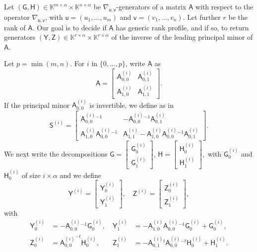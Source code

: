 \documentclass{sig-alternate}
\newcommand{\vu}{\ensuremath{\mathsf{u}}}
\newcommand{\vv}{\ensuremath{\mathsf{v}}}
\newcommand{\mA}{\ensuremath{\mathsf{A}}}
\newcommand{\mG}{\ensuremath{\mathsf{G}}}
\newcommand{\mH}{\ensuremath{\mathsf{H}}}
\newcommand{\mS}{\ensuremath{\mathsf{S}}}
\newcommand{\mY}{\ensuremath{\mathsf{Y}}}
\newcommand{\mZ}{\ensuremath{\mathsf{Z}}}
\newcommand{\K}{\ensuremath{\mathbb{K}}}
\begin{document}
Let 
$(\mG,\mH) \in \K^{m\times \alpha} \times \K^{n\times \alpha}$ be
$\nabla_{\vu,\vv}$-generators of a matrix $\mA$ with respect to the operator
$\nabla_{\vu,\vv}$, with $\vu=(u_1,\dots,u_m)$ and $\vv=(v_1,\dots,v_n)$. Let
further $r$ be the rank of $\mA$. Our goal is to decide if $\mA$ has
generic rank profile, and if so, to return generators $(\mY,\mZ) \in
\K^{r\times \alpha} \times \K^{r\times \alpha}$ of the inverse of the
leading principal minor of $\mA$.


Let $p=\min(m,n)$. For $i$ in $\{0,\dots,p\}$, write $\mA$ as
$$\mA=\left [\begin{matrix} {\mA^{(i)}_{0,0}} & \mA^{(i)}_{0,1} \\[1mm] \mA^{(i)}_{1,0} & \mA^{(i)}_{1,1}
\end{matrix}\right ].$$ 
If the principal minor
 ${\mA^{(i)}_{0,0}}$  is invertible, we define as in~\cite{Cardinal99}
$$\mS^{(i)} = \left [\begin{matrix} {\mA^{(i)}_{0,0}}{}^{-1} & -{\mA^{(i)}_{0,0}}{}^{-1} \mA^{(i)}_{0,1} \\[1mm] \mA^{(i)}_{1,0} {\mA^{(i)}_{0,0}}{}^{-1}& \mA^{(i)}_{1,1} - \mA^{(i)}_{1,0} {\mA^{(i)}_{0,0}}{}^{-1} \mA^{(i)}_{0,1} 
\end{matrix}\right ].$$
We next write the decompositions $\mG=\left [\begin{matrix}
    \mG^{(i)}_0 \\    \mG^{(i)}_1 
  \end{matrix}\right ]$, $\mH=\left [\begin{matrix} 
        \mH^{(i)}_0 \\    \mH^{(i)}_1 
  \end{matrix}\right ],$
with $\mG^{(i)}_0$ and $\mH^{(i)}_0$ of size $i \times \alpha$
and
we define
\begin{equation}
\mY^{(i)}
 = \left [\begin{matrix}
  \mY^{(i)}_0 \\    \mY^{(i)}_1 
     \end{matrix} \right ],\quad
\mZ^{(i)}
 = \left [\begin{matrix}
  \mZ^{(i)}_0 \\    \mZ^{(i)}_1 
     \end{matrix} \right ],
\end{equation}
with
\begin{align}
\mY^{(i)}_0&= -{\mA^{(i)}_{0,0}}{}^{-1} \mG^{(i)}_0,\  
&\mY^{(i)}_1&=-\mA^{(i)}_{1,0}{\mA^{(i)}_{0,0}}{}^{-1}\mG^{(i)}_0 + \mG^{(i)}_0,\label{eq:defYi}\\
\mZ^{(i)}_0&= {\mA^{(i)}_{0,0}}^{-t} \mH^{(i)}_0,\  
&\mZ^{(i)}_1&=-{\mA^{(i)}_{0,1}}{}^t{\mA^{(i)}_{0,0}}{}^{-t}\mH^{(i)}_0 + \mH^{(i)}_1\label{eq:defZi}.
\end{align}
\end{document}
